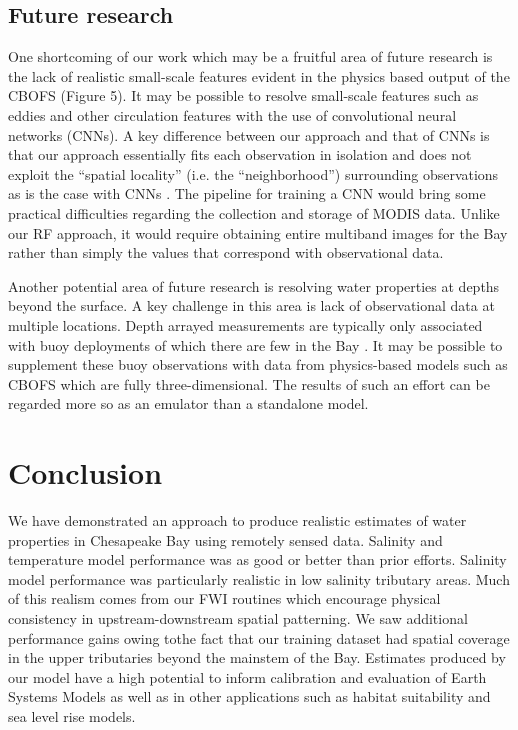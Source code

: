\documentclass{article}
\begin{document}
\subsection{Future research}

One shortcoming of our work which may be a fruitful area of future research is the lack of realistic small-scale features evident in the physics based output of the CBOFS (Figure 5). It may be possible to resolve small-scale features such as eddies and other circulation features with the use of convolutional neural networks (CNNs). A key difference between our approach and that of CNNs is that our approach essentially fits each observation in isolation and does not exploit the “spatial locality” (i.e. the “neighborhood”) surrounding observations as is the case with CNNs \cite{goodfellow2016convolutional}. The pipeline for training a CNN would bring some practical difficulties regarding the collection and storage of MODIS data. Unlike our RF approach, it would require obtaining entire multiband images for the Bay rather than simply the values that correspond with observational data.

Another potential area of future research is resolving water properties at depths beyond the surface. A key challenge in this area is lack of observational data at multiple locations. Depth arrayed measurements are typically only associated with buoy deployments of which there are few in the Bay \cite{vogelAssessingSatelliteSea2016}. It may be possible to supplement these buoy observations with data from physics-based models such as CBOFS which are fully three-dimensional. The results of such an effort can be regarded more so as an emulator than a standalone model.


\section{Conclusion}

We have demonstrated an approach to produce realistic estimates of water properties in Chesapeake Bay using remotely sensed data. Salinity and temperature model performance was as good or better than prior efforts. Salinity model performance was particularly realistic in low salinity tributary areas. Much of this realism comes from our FWI routines which encourage physical consistency in upstream-downstream spatial patterning. We saw additional performance gains owing tothe fact that our training dataset had spatial coverage in the upper tributaries beyond the mainstem of the Bay. Estimates produced by our model have a high potential to inform calibration and evaluation of Earth Systems Models as well as in other applications such as habitat suitability and sea level rise models.
\end{document}
